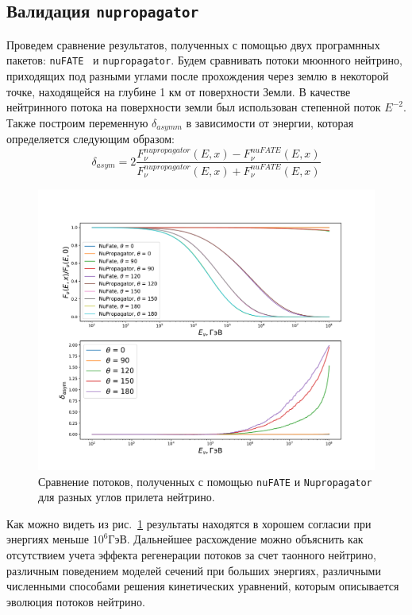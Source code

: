 \subsection{Валидация \texttt{nupropagator}}
 Проведем сравнение результатов, полученных с помощью двух програмнных пакетов: \texttt{nuFATE}~\cite{Vincent_2017} и \texttt{nupropagator}. Будем сравнивать потоки мюонного нейтрино, приходящих под разными углами после прохождения через землю в некоторой точке, находящейся на глубине 1 км от поверхности Земли. В качестве нейтринного потока на поверхности земли был использован степенной поток $E^{-2}$. Также построим переменную $\delta_{asymm}$ в зависимости от энергии, которая определяется следующим образом: 
 \begin{equation}
     \delta_{asym} = 2\frac{F^{nupropagator}_{\nu}(E,x) - F^{nuFATE}_{\nu}(E,x)}{F^{nupropagator}_{\nu}(E,x) +
     F^{nuFATE}_{\nu}(E,x)}
 \end{equation}
\begin{figure}[!h]
\centering
\includegraphics[width=\linewidth]{images/NuProp/compNuandNu.pdf}
\caption{Сравнение потоков, полученных с помощью \texttt{nuFATE} и \texttt{Nupropagator} для разных углов прилета нейтрино.}
\label{fig:flux_compare}
\end{figure}
Как можно видеть из рис.~\ref{fig:flux_compare} результаты находятся в хорошем согласии при энергиях меньше $10^6$ГэВ. Дальнейшее расхождение можно объяснить как отсутствием учета эффекта регенерации потоков за счет таонного нейтрино, различным поведением моделей сечений при больших энергиях, различными численными способами решения кинетических уравнений, которым описывается эволюция потоков нейтрино.   
